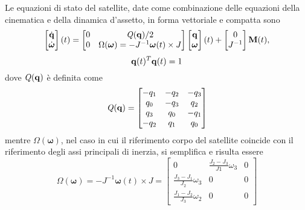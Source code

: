Le equazioni di stato del satellite, date come combinazione delle equazioni
della cinematica e della dinamica d'assetto, in forma vettoriale e compatta sono
\begin{equation}
\begin{bmatrix}
\dot{\mathit{\bf q}}\\\dot{\boldsymbol \omega}
\end{bmatrix}(t) =
\begin{bmatrix}
0 & \mathit{Q}(\mathit{\bf q})/2 \\
0 & \Omega({\boldsymbol \omega})=-J^{-1}{\boldsymbol \omega}(t)\times J
\end{bmatrix} 
\begin{bmatrix}
\mathit{\bf q}\\{\boldsymbol \omega}
\end{bmatrix}(t)+
\begin{bmatrix}
0 \\ J^{-1}
\end{bmatrix}{\bf M}(t), 
\end{equation}
\[  {\bf q}(t)^T{\bf q}(t)=1 \]
dove $\mathit{Q}(\mathit{\bf q})$ è definita come
\[ \mathit{Q}(\mathit{\bf q})=
\begin{bmatrix}
-q_1 & -q_2 & -q_3 \\
q_0 & -q_3 & q_2 \\
q_3 & q_0 & -q_1 \\
-q_2 & q_1 & q_0
\end{bmatrix} \]
mentre $\Omega({\boldsymbol \omega})$, nel caso in cui il
riferimento corpo del satellite coincide con il riferimento degli assi
principali di inerzia, si semplifica e risulta essere
\[ \Omega({\boldsymbol \omega})= -J^{-1}{\boldsymbol \omega}(t)\times J =
\begin{bmatrix}
0 & \frac{J_2-J_3}{J1}\omega_3 & 0 \\
\frac{J_3-J_1}{J_2}\omega_3 & 0 & 0 \\
\frac{J_1-J_2}{J_3}\omega_2 & 0 & 0
\end{bmatrix} \]